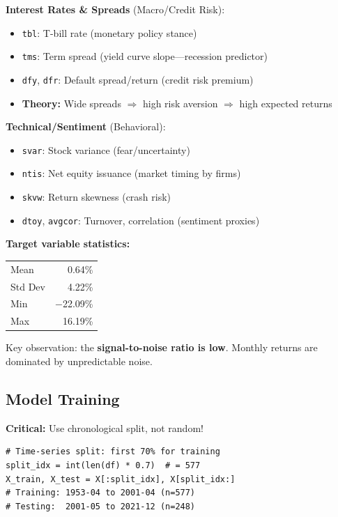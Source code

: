 \documentclass[11pt,a4paper]{article}
\newcommand{\keyword}[1]{\textbf{\textcolor{AccentOrange}{#1}}}
\begin{document}
\textbf{Interest Rates \& Spreads} (Macro/Credit Risk):
\begin{itemize}
    \item \texttt{tbl}: T-bill rate (monetary policy stance)
    \item \texttt{tms}: Term spread (yield curve slope---recession predictor)
    \item \texttt{dfy}, \texttt{dfr}: Default spread/return (credit risk premium)
    \item \textbf{Theory:} Wide spreads $\Rightarrow$ high risk aversion $\Rightarrow$ high expected returns
\end{itemize}

\textbf{Technical/Sentiment} (Behavioral):
\begin{itemize}
    \item \texttt{svar}: Stock variance (fear/uncertainty)
    \item \texttt{ntis}: Net equity issuance (market timing by firms)
    \item \texttt{skvw}: Return skewness (crash risk)
    \item \texttt{dtoy}, \texttt{avgcor}: Turnover, correlation (sentiment proxies)
\end{itemize}

\textbf{Target variable statistics:}
\begin{center}
\begin{tabular}{lr}
    \toprule
    Mean & 0.64\% \\
    Std Dev & 4.22\% \\
    Min & $-$22.09\% \\
    Max & 16.19\% \\
    \bottomrule
\end{tabular}
\end{center}

Key observation: the \keyword{signal-to-noise ratio is low}. Monthly returns are dominated by unpredictable noise.

\subsection{Model Training}

\textbf{Critical:} Use chronological split, not random!
\begin{verbatim}
# Time-series split: first 70% for training
split_idx = int(len(df) * 0.7)  # = 577
X_train, X_test = X[:split_idx], X[split_idx:]
# Training: 1953-04 to 2001-04 (n=577)
# Testing:  2001-05 to 2021-12 (n=248)
\end{verbatim}
\end{document}
